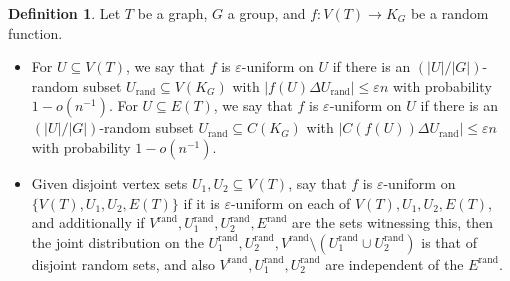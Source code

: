 \documentclass[a4paper,11pt,hidelinks]{amsart}
\theoremstyle{definition}
\newtheorem{definition}[theorem]{Definition}
\begin{document}
\begin{definition}
Let $T$ be a graph, $G$ a group,  and $f:V(T)\to K_G$ be a random function. 
\begin{itemize}
\item For $U\subseteq V(T)$, we say that $f$ is $\varepsilon$-uniform on $U$ if there is an $(|U|/|G|)$-random subset $U_{\mathrm{rand}}\subseteq V(K_G)$ with $|f(U)\Delta U_{\mathrm{rand}}|\leq \varepsilon n$ with probability $1-o(n^{-1})$. 
For $U\subseteq E(T)$, we say that $f$ is $\varepsilon$-uniform on $U$ if there is an $(|U|/|G|)$-random subset $U_{\mathrm{rand}}\subseteq C(K_G)$ with $|C(f(U))\Delta U_{\mathrm{rand}}|\leq \varepsilon n$ with probability $1-o(n^{-1})$. 

\item  Given disjoint vertex sets $U_1, U_2\subseteq V(T)$, say that $f$ is $\varepsilon$-uniform on $\{V(T), U_1, U_2, E(T)\}$ if  it is $\varepsilon$-uniform on each of $V(T), U_1, U_2, E(T)$, and additionally if  $V^{\mathrm{rand}}, U_1^{\mathrm{rand}}, U_2^{\mathrm{rand}}, E^{\mathrm{rand}}$ are the sets witnessing this, then the joint distribution on the $U_1^{\mathrm{rand}}, U_2^{\mathrm{rand}}, V^{\mathrm{rand}}\setminus (U_1^{\mathrm{rand}}\cup U_2^{\mathrm{rand}})$ is that of disjoint random sets, and also  $V^{\mathrm{rand}}, U_1^{\mathrm{rand}}, U_2^{\mathrm{rand}} $  are independent of the $E^{\mathrm{rand}}$. 

\end{itemize}
\end{definition}
\end{document}
